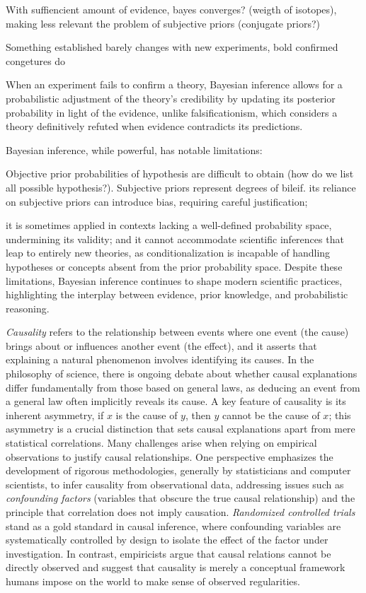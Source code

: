 With suffiencient amount of evidence, bayes converges? (weigth of isotopes), making less relevant the problem of subjective priors (conjugate priors?)

\begin{example}
{\color{red} Something established barely changes with new experiments, bold confirmed congetures do}
\end{example}

When an experiment fails to confirm a theory, Bayesian inference allows for a probabilistic adjustment of the theory's credibility by updating its posterior probability in light of the evidence, unlike falsificationism, which considers a theory definitively refuted when evidence contradicts its predictions.

Bayesian inference, while powerful, has notable limitations:

Objective prior probabilities of hypothesis are difficult to obtain (how do we list all possible hypothesis?). Subjective priors represent degrees of bileif. its reliance on subjective priors can introduce bias, requiring careful justification;

 it is sometimes applied in contexts lacking a well-defined probability space, undermining its validity; and it cannot accommodate scientific inferences that leap to entirely new theories, as conditionalization is incapable of handling hypotheses or concepts absent from the prior probability space. Despite these limitations, Bayesian inference continues to shape modern scientific practices, highlighting the interplay between evidence, prior knowledge, and probabilistic reasoning.

\emph{Causality} refers to the relationship between events where one event (the cause) brings about or influences another event (the effect), and it asserts that explaining a natural phenomenon involves identifying its causes. In the philosophy of science, there is ongoing debate about whether causal explanations differ fundamentally from those based on general laws, as deducing an event from a general law often implicitly reveals its cause. A key feature of causality is its inherent asymmetry, if $x$ is the cause of $y$, then $y$ cannot be the cause of $x$; this asymmetry is a crucial distinction that sets causal explanations apart from mere statistical correlations. Many challenges arise when relying on empirical observations to justify causal relationships. One perspective emphasizes the development of rigorous methodologies, generally by statisticians and computer scientists, to infer causality from observational data, addressing issues such as \emph{confounding factors} (variables that obscure the true causal relationship) and the principle that correlation does not imply causation. \emph{Randomized controlled trials} stand as a gold standard in causal inference, where confounding variables are systematically controlled by design to isolate the effect of the factor under investigation. In contrast, empiricists argue that causal relations cannot be directly observed and suggest that causality is merely a conceptual framework humans impose on the world to make sense of observed regularities.

